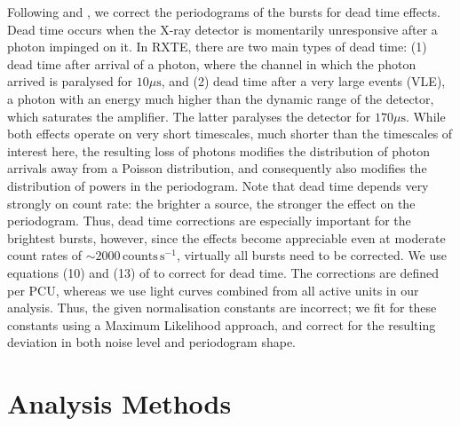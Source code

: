\documentclass[numberedappendix]{emulateapj}
\begin{document}
Following \citet{zhang1995} and \citet{jahoda2006}, we correct the periodograms of the bursts for dead time effects. Dead time occurs when the X-ray detector is momentarily unresponsive after a photon impinged on it. In RXTE, there are two main types of dead time: (1) dead time after arrival of a photon, where the channel in which the photon arrived is paralysed for $10\mu\mathrm{s}$, and (2) dead time after a very large events (VLE), a photon with an energy much higher than the dynamic range of the detector, which saturates the amplifier. The latter paralyses the detector for $170\mu\mathrm{s}$. While both effects operate on very short timescales, much shorter than the timescales of interest here, the resulting loss of photons modifies the distribution of photon arrivals away from a Poisson distribution, and consequently also modifies the distribution of powers in the periodogram. Note that dead time depends very strongly on count rate: the brighter a source, the stronger the effect on the periodogram. Thus, dead time corrections are especially important for the brightest bursts, however, since the effects become appreciable even at moderate count rates of $\sim 2000 \,\mathrm{counts}\,\mathrm{s}^{-1}$, virtually all bursts need to be corrected. We use equations (10) and (13) of \citet{jahoda2006} to correct for dead time. The corrections are defined per PCU, whereas we use light curves combined from all active units in our analysis. Thus, the given normalisation constants are incorrect; we fit for these constants using a Maximum Likelihood approach, and correct for the resulting deviation in both noise level and periodogram shape. 


\section{Analysis Methods}
\label{sec:analysis}
\end{document}
